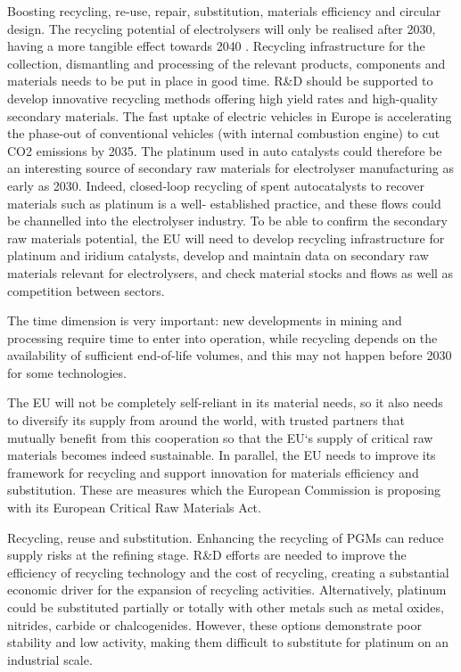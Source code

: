 Boosting recycling, re-use, repair, substitution, materials efficiency and circular design.
The recycling potential of electrolysers will only be realised after 2030, having a more tangible
effect towards 2040 \cite{worldbank2022hydrogen}. Recycling infrastructure for the collection, dismantling
and processing of the relevant products, components and materials needs to be put in place in
good time. R&D should be supported to develop innovative recycling methods offering high yield
rates and high-quality secondary materials. The fast uptake of electric vehicles in Europe is
accelerating the phase-out of conventional vehicles (with internal combustion engine) to cut
CO2 emissions by 2035. The platinum used in auto catalysts could therefore be an interesting
source of secondary raw materials for electrolyser manufacturing as early as 2030. Indeed,
closed-loop recycling of spent autocatalysts to recover materials such as platinum is a well-
established practice, and these flows could be channelled into the electrolyser industry. To be able
to confirm the secondary raw materials potential, the EU will need to develop recycling
infrastructure for platinum and iridium catalysts, develop and maintain data on secondary raw
materials relevant for electrolysers, and check material stocks and flows as well as competition
between sectors.

The time dimension is very important: new developments in mining and processing require time
to enter into operation, while recycling depends on the availability of sufficient end-of-life
volumes, and this may not happen before 2030 for some technologies.

The EU will not be completely self-reliant in its material needs, so it also needs to diversify its supply from
around the world, with trusted partners that mutually benefit from this cooperation  so that the EU`s supply
of critical raw materials becomes indeed sustainable. In parallel, the EU needs to improve its framework for
recycling and support innovation for materials efficiency and substitution. These are measures which the
European Commission is proposing with its European Critical Raw Materials Act.



Recycling, reuse and substitution. Enhancing the recycling of PGMs can reduce supply risks at
the refining stage. R&D efforts are needed to improve the efficiency of recycling technology and
the cost of recycling, creating a substantial economic driver for the expansion of recycling
activities. Alternatively, platinum could be substituted partially or totally with other metals such as
metal oxides, nitrides, carbide or chalcogenides. However, these options demonstrate poor stability
and low activity, making them difficult to substitute for platinum on an industrial scale.


